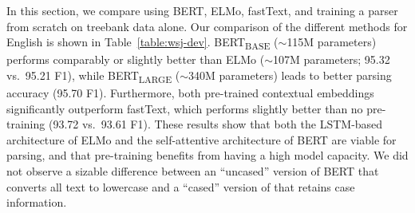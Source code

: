 \documentclass[11pt,a4paper]{article}
\begin{document}
\begin{table}[t]
\begin{center}
 \end{center}
\caption{\label{table:wsj-dev} Comparison of parsing accuracy on the WSJ development set when using different word representations. $^a$\citet{kitaev_2018_self_attentive}}
\end{table}

In this section, we compare using BERT, ELMo, fastText, and training a parser from scratch on treebank data alone.
Our comparison of the different methods for English is shown in Table~\ref{table:wsj-dev}.
BERT\textsubscript{BASE}
($\sim$115M parameters)
performs comparably or slightly better than ELMo ($\sim$107M parameters; 95.32 vs.\ 95.21 F1), while
BERT\textsubscript{LARGE}
($\sim$340M parameters)
leads to better parsing accuracy (95.70 F1). Furthermore, both pre-trained contextual embeddings significantly outperform fastText, which performs slightly better than no pre-training (93.72 vs.\ 93.61 F1). These results show that both the LSTM-based architecture of ELMo and the self-attentive architecture of BERT are viable for parsing, and that pre-training benefits from having a high model capacity. We did not observe a sizable difference between an ``uncased'' version of BERT that converts all text to lowercase and a ``cased'' version of that retains case information.
\end{document}

